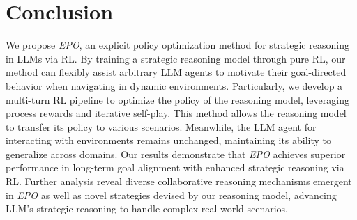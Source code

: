 \section{Conclusion}

We propose \textit{EPO}, an explicit policy optimization method for strategic reasoning in LLMs via RL.
By training a strategic reasoning model through pure RL, our method can flexibly assist arbitrary LLM agents to motivate their goal-directed behavior when navigating in dynamic environments. 
Particularly, we develop a multi-turn RL pipeline to optimize the policy of the reasoning model, leveraging process rewards and iterative self-play. This method allows the reasoning model to transfer its policy to various scenarios. Meanwhile, the LLM agent for interacting with environments remains unchanged, maintaining its ability to generalize across domains. Our results demonstrate that \textit{EPO} achieves superior performance in long-term goal alignment with enhanced strategic reasoning via RL.
Further analysis reveal diverse collaborative reasoning mechanisms emergent in \textit{EPO} as well as novel strategies devised by our reasoning model, advancing LLM's strategic reasoning to handle complex real-world scenarios.



